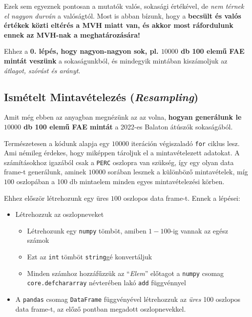 \documentclass[
]{book}
\providecommand{\tightlist}{%
  \setlength{\itemsep}{0pt}\setlength{\parskip}{0pt}}
\begin{document}
Ezek sem egyeznek pontosan a mutatók valós, sokasági értékével, de \emph{nem térnek el nagyon durván} a valóságtól. Most is abban bízunk, hogy a \textbf{becsült és valós értékek közti eltérés a MVH miatt van, és akkor most ráfordulunk ennek az MVH-nak a meghatározására!}

Ehhez a \textbf{0. lépés, hogy nagyon-nagyon sok, pl. \(10000\) db 100 elemű FAE mintát veszünk} a sokaságunkból, és mindegyik mintában kiszámoljuk az \emph{átlagot, szórást és arányt}.

\subsection{\texorpdfstring{Ismételt Mintavételezés (\emph{Resampling})}{Ismételt Mintavételezés (Resampling)}}\label{ismuxe9telt-mintavuxe9telezuxe9s-resampling}

Amit még ebben az anyagban megnézünk az az volna, \textbf{hogyan generálunk le \(10000\) db 100 elemű FAE mintát} a 2022-es Balaton átúszók sokaságából.

Természetesen a kódunk alapja egy \(10000\) iteráción végiszaladó \texttt{for} ciklus lesz. Ami némileg érdekes, hogy miképpen tároljuk el a mintavételezett adatokat. A számításokhoz igazából csak a \texttt{PERC} oszlopra van szükség, így egy olyan data frame-t generálunk, aminek \(10000\) sorában lesznek a különböző mintavételek, míg \(100\) oszlopában a 100 db mintaelem minden egyes mintavételezési körben.

Ehhez először létrehozunk egy üres \(100\) oszlopos data frame-t. Ennek a lépései:

\begin{itemize}
\tightlist
\item
  Létrehozzuk az oszlopneveket

  \begin{itemize}
  \tightlist
  \item
    Létrehozunk egy \texttt{numpy} tömböt, amiben \(1-100\)-ig vannak az egész számok
  \item
    Ezt az \texttt{int} tömböt \texttt{string}gé konvertáljuk
  \item
    Minden számhoz hozzáfűzzük az ``\emph{Elem}'' előtagot a \texttt{numpy} csomag \texttt{core.defchararray} névterében lakó \texttt{add} függvénnyel
  \end{itemize}
\item
  A \texttt{pandas} csomag \texttt{DataFrame} függvényével létrehozzuk az \emph{üres} 100 oszlopos data frame-t, az előző pontban megadott oszlopnevekkel.
\end{itemize}
\end{document}
